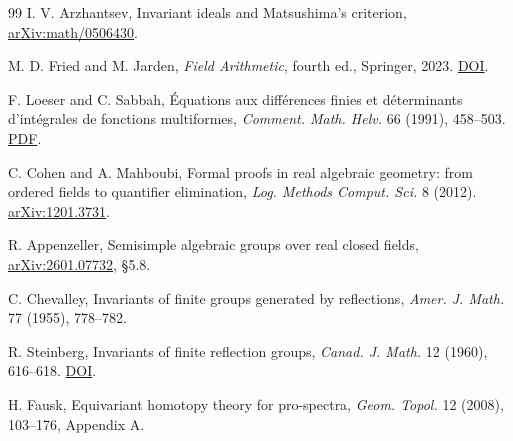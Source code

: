 \documentclass[11pt]{article}
\begin{document}
\begin{thebibliography}{99}
I. V. Arzhantsev, Invariant ideals and Matsushima's criterion,
\href{https://arxiv.org/abs/math/0506430}{arXiv:math/0506430}.

M. D. Fried and M. Jarden, \emph{Field Arithmetic}, fourth ed.,
Springer, 2023. \href{https://doi.org/10.1007/978-3-031-28020-7}{DOI}.

F. Loeser and C. Sabbah, \'Equations aux diff\'erences finies et
d\'eterminants d'int\'egrales de fonctions multiformes,
\emph{Comment. Math. Helv.} 66 (1991), 458--503.
\href{https://perso.pages.math.cnrs.fr/users/claude.sabbah/articles/loeser-sabbah91.pdf}{PDF}.

C. Cohen and A. Mahboubi, Formal proofs in real algebraic geometry:
from ordered fields to quantifier elimination,
\emph{Log. Methods Comput. Sci.} 8 (2012).
\href{https://arxiv.org/abs/1201.3731}{arXiv:1201.3731}.

R. Appenzeller, Semisimple algebraic groups over real closed fields,
\href{https://arxiv.org/abs/2601.07732}{arXiv:2601.07732}, \S5.8.

C. Chevalley, Invariants of finite groups generated by reflections,
\emph{Amer. J. Math.} 77 (1955), 778--782.

R. Steinberg, Invariants of finite reflection groups,
\emph{Canad. J. Math.} 12 (1960), 616--618.
\href{https://doi.org/10.4153/CJM-1960-055-3}{DOI}.

H. Fausk, Equivariant homotopy theory for pro-spectra,
\emph{Geom. Topol.} 12 (2008), 103--176, Appendix A.
\end{thebibliography}
\end{document}

